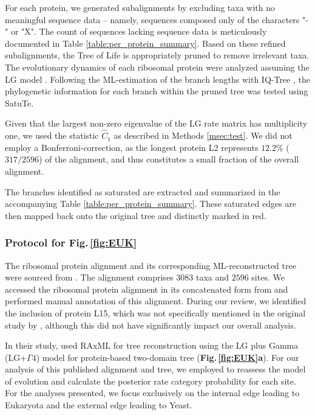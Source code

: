  For each protein, we generated  subalignments by excluding taxa with no meaningful sequence data -- namely, sequences composed only of the characters "-" or "X". The count of sequences lacking sequence data is meticulously documented in Table \ref{table:per_protein_summary}. Based on these refined subalignments, the Tree of Life is appropriately pruned to remove irrelevant taxa. The evolutionary dynamics of  each ribosomal protein were analyzed assuming the LG model . Following the ML-estimation of the branch lengths with IQ-Tree , the phylogenetic information for each branch within the pruned tree was tested using SatuTe. 
 
\medskip
 Given that the largest non-zero eigenvalue of the LG rate matrix has multiplicity one, we used the statistic $\hat{C}_1$ as described in Methods \ref{msec:test}. We  did not employ a Bonferroni-correction, as the longest protein L2 represents $12.2\%$ ($317/2596$) of the alignment, and thus constitutes a small fraction of the overall alignment.
 
 \medskip
 
The branches identified as saturated are extracted and summarized in the accompanying Table  \ref{table:per_protein_summary}. These saturated edges are then mapped back onto the original tree and distinctly marked in red.

\bigskip

\subsubsection*{Protocol for Fig.\,\ref{fig:EUK}}\label{msec:protocol_sliding_window_analysis}

The ribosomal protein alignment and its corresponding ML-reconstructed tree were sourced from . The  alignment comprises $3083$ taxa and $2596$ sites. We accessed the ribosomal protein alignment in its concatenated form from  and performed manual annotation of this alignment. During our review, we identified the inclusion of protein L15, which was not specifically mentioned in the original study by , although this did not have significantly impact our overall analysis.

In their study,  used RAxML  for tree reconstruction using the LG plus Gamma (LG+$\Gamma 4$) model  for protein-based two-domain tree (\textbf{Fig.\,\ref{fig:EUK}a}). For our analysis of this published alignment and tree, we employed   to reassess the model of evolution and calculate the posterior rate category probability for each site. For the analyses presented, we focus exclusively on the internal edge leading to Eukaryota and the external edge leading to Yeast.

